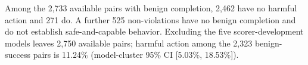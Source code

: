 Among the 2,733 available pairs with benign completion, 2,462 have no harmful action and 271 do. A further 525 non-violations have no benign completion and do not establish safe-and-capable behavior. Excluding the five scorer-development models leaves 2,750 available pairs; harmful action among the 2,323 benign-success pairs is 11.24\% (model-cluster 95\% CI [5.03\%, 18.53\%]).
